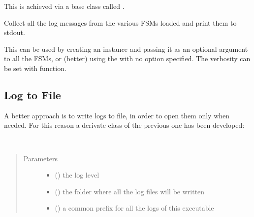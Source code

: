 \documentclass[letterpaper,10pt,english]{sphinxmanual}
\begin{document}
This is achieved via a base class called {\hyperref[\detokenize{logger:fsmLogger}]{}}.

\begin{fulllineitems}
\label{\detokenize{logger:fsmLogger}}
Collect all the log messages from the various FSMs loaded and print them to
stdout.

\end{fulllineitems}


This can be used by creating an instance and passing it as an optional argument
to all the FSMs, or (better) using the {\hyperref[\detokenize{loader:module-loader}]{}} with no option specified. The verbosity can be set with  function.


\subsection{Log to File}
\label{\detokenize{logger:log-to-file}}
A better approach is to write logs to file, in order to open them only when
needed. For this reason a derivate class of the previous one has been developed:

\begin{fulllineitems}
\label{\detokenize{logger:fsmFileLogger}}~\begin{quote}\begin{description}
\item[{Parameters}] \leavevmode\begin{itemize}
\item {} 
 () \textendash{} the log level

\item {} 
 () \textendash{} the folder where all the log files will be written

\item {} 
 () \textendash{} a common prefix for all the logs of this executable

\end{itemize}

\end{description}\end{quote}

\end{fulllineitems}
\end{document}
